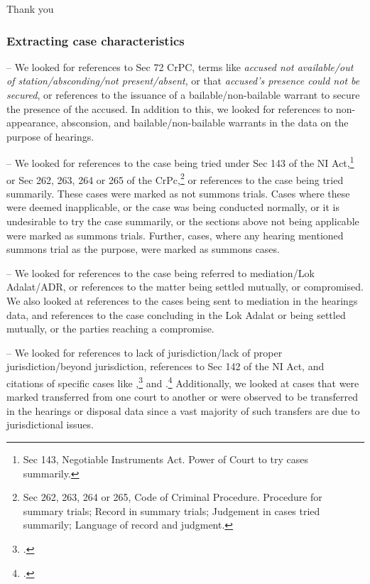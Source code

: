 \documentclass[10pt,aspectratio=169]{beamer}
\begin{document}
\begin{frame}
 \centering \huge{Thank you}
\end{frame}

\begin{frame}[allowframebreaks]
  \frametitle{Extracting case characteristics}
  \begin{description}
  \item [Non-appearance by the accused] -- We looked for references to Sec 72 CrPC, terms like \emph{accused not available/out of station/absconding/not present/absent}, or that \emph{accused's presence could not be secured}, or references to the issuance of a bailable/non-bailable warrant to secure the presence of the accused. In addition to this, we looked for references to non-appearance, absconsion, and bailable/non-bailable warrants in the data on the purpose of hearings.
  \item \item [Case being converted to a summons trial] -- We looked for references to the case being tried under Sec 143 of the NI Act,\footnote{Sec 143, Negotiable Instruments Act. Power of Court to try cases summarily.} or Sec 262, 263, 264 or 265 of the CrPc,\footnote{Sec 262, 263, 264 or 265, Code of Criminal Procedure. Procedure for summary trials; Record in summary trials; Judgement in cases tried summarily; Language of record and judgment.} or references to the case being tried summarily. These cases were marked as not summons trials. Cases where these were deemed inapplicable, or the case was being conducted normally, or it is undesirable to try the case summarily, or the sections above not being applicable were marked as summons trials. Further, cases, where any hearing mentioned summons trial as the purpose, were marked as summons cases.
  \item \item [Case referred to mediation] -- We looked for references to the case being referred to mediation/Lok Adalat/ADR, or references to the matter being settled mutually, or compromised. We also looked at references to the cases being sent to mediation in the hearings data, and references to the case concluding in the Lok Adalat or being settled mutually, or the parties reaching a compromise.
  \item [Jurisdiction issue] -- We looked for references to lack of jurisdiction/lack of proper jurisdiction/beyond jurisdiction, references to Sec 142 of the NI Act, and citations of specific cases like ,\footcite{sc2014_dhanuka} and .\footcite{sc2016_carbon} Additionally, we looked at cases that were marked transferred from one court to another or were observed to be transferred in the hearings or disposal data since a vast majority of such transfers are due to jurisdictional issues.

\end{description}
\end{frame}
\end{document}
